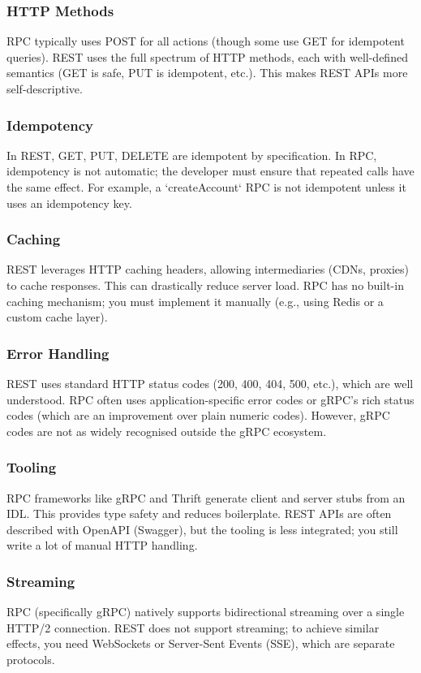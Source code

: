 \documentclass[10pt,a4paper]{article}
\begin{document}
\subsubsection{HTTP Methods}
RPC typically uses POST for all actions (though some use GET for idempotent queries). REST uses the full spectrum of HTTP methods, each with well-defined semantics (GET is safe, PUT is idempotent, etc.). This makes REST APIs more self-descriptive.

\subsubsection{Idempotency}
In REST, GET, PUT, DELETE are idempotent by specification. In RPC, idempotency is not automatic; the developer must ensure that repeated calls have the same effect. For example, a `createAccount` RPC is not idempotent unless it uses an idempotency key.

\subsubsection{Caching}
REST leverages HTTP caching headers, allowing intermediaries (CDNs, proxies) to cache responses. This can drastically reduce server load. RPC has no built-in caching mechanism; you must implement it manually (e.g., using Redis or a custom cache layer).

\subsubsection{Error Handling}
REST uses standard HTTP status codes (200, 400, 404, 500, etc.), which are well understood. RPC often uses application-specific error codes or gRPC’s rich status codes (which are an improvement over plain numeric codes). However, gRPC codes are not as widely recognised outside the gRPC ecosystem.

\subsubsection{Tooling}
RPC frameworks like gRPC and Thrift generate client and server stubs from an IDL. This provides type safety and reduces boilerplate. REST APIs are often described with OpenAPI (Swagger), but the tooling is less integrated; you still write a lot of manual HTTP handling.

\subsubsection{Streaming}
RPC (specifically gRPC) natively supports bidirectional streaming over a single HTTP/2 connection. REST does not support streaming; to achieve similar effects, you need WebSockets or Server-Sent Events (SSE), which are separate protocols.
\end{document}
